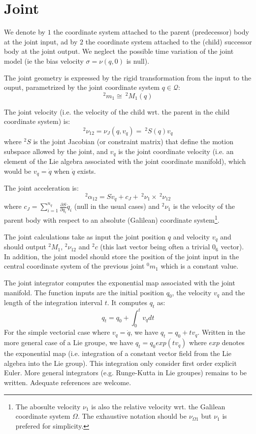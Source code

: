 \documentclass[11pt,twoside,a4paper]{article}
\newcommand{\repr}{\cong}
\newcommand{\dpartial}[2]{\frac{\partial{#1}}{\partial{#2}}}
\begin{document}
\section{Joint}

We denote by $1$ the coordinate system attached to the parent (predecessor) body at the joint input, ad by $2$ the coordinate system attached to the (child) successor body at the joint output. We neglect the possible time variation of the joint model (ie the bias velocity $\sigma = \nu(q,0)$ is null).

The joint geometry is expressed by the rigid transformation from the input to the ouput, parametrized by the joint coordinate system $q \in \mathcal{Q}$:
$$ ^2m_1 \repr \ ^2M_1(q)$$

The joint velocity (i.e. the velocity of the child wrt. the parent in the child coordinate system) is:
$$^2\nu_{12} = \nu_J(q,v_q) = \ ^2S(q) v_q $$
where $^2S$ is the joint Jacobian (or constraint matrix) that define the motion subspace allowed by the joint, and $v_q$ is the joint coordinate velocity (i.e. an element of the Lie algebra associated with the joint coordinate manifold), which would be $v_q=\dot q$ when $\dot q$ exists.

The joint acceleration is:
$$^2\alpha_{12} = S \dot v_q + c_J + \ ^2\nu_{1} \times \ ^2\nu_{12}$$
where $c_J = \sum_{i=1}^{n_q} \dpartial{S}{q_i} \dot q_i$ (null in the usual cases) and $^2\nu_{1}$ is the velocity of the parent body with respect to an absolute (Galilean) coordinate system\footnote{The abosulte velocity $\nu_{1}$ is also the relative velocity wrt. the Galilean coordinate system $\Omega$. The exhaustive notation should be $\nu_{\Omega1}$ but $\nu_1$ is prefered for simplicity.}.

The joint calculations take as input the joint position $q$ and velocity $v_q$ and should output $^2M_1$, $^2\nu_{12}$ and $^2c$ (this last vector being often a trivial $0_6$ vector). In addition, the joint model should store the position of the joint input in the central coordinate system of the previous joint $^0m_1$ which is a constant value.

The joint integrator computes the exponential map associated with the joint manifold. The function inputs are the initial position $q_0$, the velocity $v_q$  and the length of the integration interval $t$. It computes $q_t$ as:
$$ q_t = q_0 + \int_0^t v_q dt$$
For the simple vectorial case where $v_q=\dot q$, we have $q_t=q_0 + t v_q$. Written in the more general case of a Lie groupe, we have $q_t = q_0 exp(t v_q)$ where $exp$ denotes the exponential map (i.e. integration of a constant vector field from the Lie algebra into the Lie group). This integration only consider first order explicit Euler. More general integrators (e.g. Runge-Kutta in Lie groupes) remains to be written. Adequate references are welcome.
\end{document}
